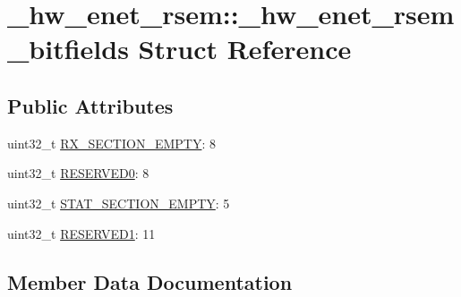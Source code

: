 \hypertarget{struct__hw__enet__rsem_1_1__hw__enet__rsem__bitfields}{}\section{\+\_\+hw\+\_\+enet\+\_\+rsem\+:\+:\+\_\+hw\+\_\+enet\+\_\+rsem\+\_\+bitfields Struct Reference}
\label{struct__hw__enet__rsem_1_1__hw__enet__rsem__bitfields}
\subsection*{Public Attributes}
\begin{DoxyCompactItemize}
\item 
uint32\+\_\+t \hyperlink{struct__hw__enet__rsem_1_1__hw__enet__rsem__bitfields_ae11f97bfea1349d009b05a2cb6ef580b}{R\+X\+\_\+\+S\+E\+C\+T\+I\+O\+N\+\_\+\+E\+M\+P\+TY}\+: 8
\item 
uint32\+\_\+t \hyperlink{struct__hw__enet__rsem_1_1__hw__enet__rsem__bitfields_add529a9cbe65920e834b5311325e9127}{R\+E\+S\+E\+R\+V\+E\+D0}\+: 8
\item 
uint32\+\_\+t \hyperlink{struct__hw__enet__rsem_1_1__hw__enet__rsem__bitfields_a710a6b6e54bf080736d5da075589df0a}{S\+T\+A\+T\+\_\+\+S\+E\+C\+T\+I\+O\+N\+\_\+\+E\+M\+P\+TY}\+: 5
\item 
uint32\+\_\+t \hyperlink{struct__hw__enet__rsem_1_1__hw__enet__rsem__bitfields_a5174d84a4c010d2b1b9521f4bfd09432}{R\+E\+S\+E\+R\+V\+E\+D1}\+: 11
\end{DoxyCompactItemize}


\subsection{Member Data Documentation}
